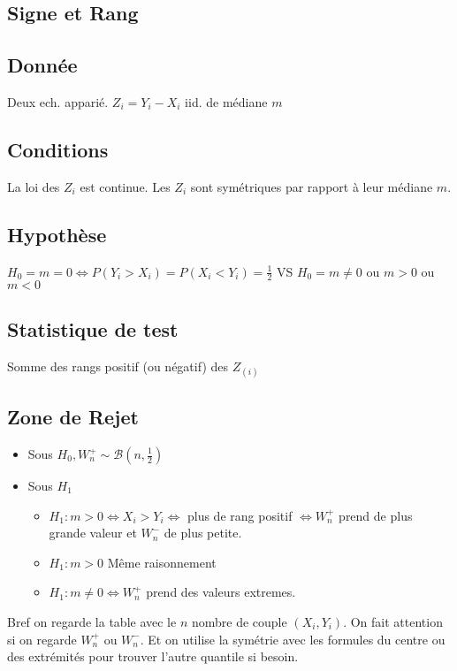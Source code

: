\documentclass[9pt]{article}
\theoremstyle{plain}%
\theoremstyle{definition}
\theoremstyle{remark}
\begin{document}
\begin{multicols}{3}
\section{Signe et Rang}
\subsection*{Donnée}
Deux ech. apparié. $ Z_i = Y_i - X_i $ iid. de médiane $ m $

\subsection*{Conditions}
La loi des $ Z_i $ est continue. Les $ Z_i $ sont symétriques par rapport à leur médiane $ m $.

\subsection*{Hypothèse}
$ H_0 = m = 0 \Leftrightarrow P(Y_i > X_i) = P(X_i < Y_i) = \frac{1}{2}$ VS $ H_0 = m \neq 0 $ ou $ m > 0 $ ou $ m < 0 $ 

\subsection*{Statistique de test}
Somme des rangs positif (ou négatif) des $ Z_{(i)} $

\subsection*{Zone de Rejet}
\begin{itemize}
    \item Sous $ H_0, W_n^+ \sim \mathcal{B}(n, \frac{1}{2}) $ 
    \item Sous $ H_1 $ \begin{itemize}
        \item $ H_1 : m > 0 \Leftrightarrow X_i > Y_i \Leftrightarrow $ plus de rang positif $ \Leftrightarrow W_n^+ $ prend de plus grande valeur et $ W_n^- $ de plus petite.
        \item $ H_1 : m > 0 $ Même raisonnement
        \item $ H_1 : m \neq 0 \Leftrightarrow W_n^+ $ prend des valeurs extremes.
    \end{itemize}
\end{itemize}
Bref on regarde la table avec le $ n $ nombre de couple $ (X_i, Y_i) $. On fait attention si on regarde $ W_n^+ $ ou $ W_n^- $. Et on utilise la symétrie avec les formules du centre ou des extrémités pour trouver l'autre quantile si besoin.

\end{multicols}
\end{document}
